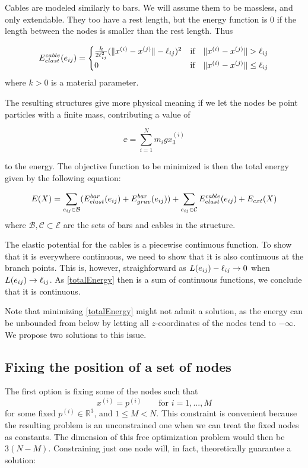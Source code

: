 Cables are modeled similarly to bars. We will assume them to be massless, and only extendable. They too have a rest length, but the energy function is $0$ if the length between the nodes is smaller than the rest length. Thus

\begin{equation}
E^{cable}_{elast}(e_{ij}) = \begin{cases}
    \frac{k}{2\ell_{ij}^2}(\lVert x^{(i)} - x^{(j)}\rVert-\ell_{ij})^2 & \text{if} \quad \lVert x^{(i)} - x^{(j)}\rVert >\ell_{ij}\\
    0 & \text{if} \quad \lVert x^{(i)} - x^{(j)}\rVert \leq \ell_{ij}
    \end{cases}
    \label{cableElast}
\end{equation}
where $k > 0$ is a material parameter.

The resulting structures give more physical meaning if we let the nodes be point particles with a finite mass, contributing a value of

\begin{equation}
    \ee = \sum_{i=1}^{N} m_i g x_3^{(i)}
    \label{externalEnergy}
\end{equation}

to the energy. The objective function to be minimized is then the total energy given by the following equation:

\begin{equation}
    E(X) = \sum\limits_{e_{ij} \in \mathcal{B}}(E^{bar}_{elast}(e_{ij}) + E^{bar}_{grav}(e_{ij})) + \sum\limits_{e_{ij} \in \mathcal{C}} E^{cable}_{elast}(e_{ij}) + E_{ext}(X)
    \label{totalEnergy}
\end{equation} where $\mathcal{B}, \mathcal{C} \subset \mathcal{E}$ are the sets of bars and cables in the structure.

The elastic potential for the cables is a piecewise continuous function. To show that it is everywhere continuous, we need to show that it is also continuous at the branch points. This is, however, straighforward as $L(e_{ij}) - \ell_{ij} \rightarrow 0$ when $L(e_{ij}) \rightarrow \ell_{ij}$. As \eqref{totalEnergy} then is a sum of continuous functions, we conclude that it is continuous.

Note that minimizing \eqref{totalEnergy} might not admit a solution, as the energy can be unbounded from below by letting all $z$-coordinates of the nodes tend to $-\infty$. We propose two solutions to this issue.

\subsection{Fixing the position of a set of nodes}
The first option is fixing some of the nodes such that
\begin{equation}
    x^{(i)} = p^{(i)} \qquad \text{for } i = 1,...,M
    \label{fixednode}
\end{equation} for some fixed $p^{(i)} \in \mathbb{R}^3$, and $1\leq M < N$. This constraint is convenient because the resulting problem is an unconstrained one when we can treat the fixed nodes as constants. The dimension of this free optimization problem would then be $3(N-M)$. Constraining just one node will, in fact, theoretically guarantee a solution:

